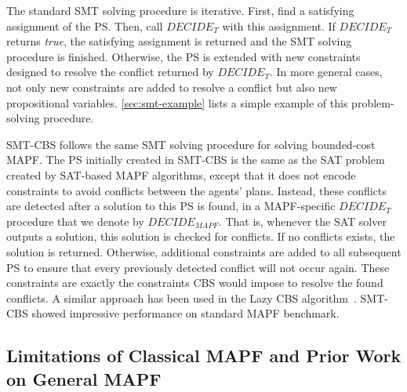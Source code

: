 \documentclass[review]{elsarticle}
\newcommand{\decidet}{\ensuremath{\mathit{DECIDE_T}}\xspace}
\newcommand{\decidemapf}{\ensuremath{\mathit{DECIDE_{MAPF}}}\xspace}
\newcommand\konstantin[1]{\nb{\textbf{Konstantin:}}{red}{#1}}
\newcommand\roni[1]{\nb{\textbf{Roni:}}{green}{#1}}
\newcommand{\smt}{\ac{SMT}\xspace}
\newcommand{\cbs}{\ac{CBS}\xspace}
\newcommand{\ps}{\ac{PS}\xspace}
\newcommand{\smtcbsO}{SMT-CBS\xspace} %
\newcommand{\mapf}{\ac{MAPF}\xspace}
\newcommand{\true}{\textit{true}\xspace}
\begin{document}
The standard \smt solving procedure is iterative. First, find a satisfying assignment of the \ps. 
Then, call \decidet with this assignment. If \decidet returns \true, the satisfying assignment is returned and the \smt solving procedure is finished. 
Otherwise, the \ps is extended with new constraints designed to resolve the conflict returned by \decidet. 
In more general cases, not only new constraints are added to resolve a conflict but also new propositional variables. \ref{sec:smt-example} lists a simple example of this problem-solving procedure. 


\smtcbsO follows the same \smt solving procedure for solving bounded-cost \mapf. The \ps initially created in \smtcbsO is the same as the SAT problem created by SAT-based \mapf algorithms, except that it does not encode constraints to avoid conflicts between the agents' plans. 
Instead, these conflicts are detected after a solution to this \ps is found, in a \mapf-specific \decidet procedure that we denote by \decidemapf. 
That is, whenever the SAT solver outputs a solution, this solution is checked for conflicts. If no conflicts exists, the solution is returned. Otherwise, additional constraints are added to all subsequent \ps to ensure that every previously detected conflict will not occur again. These constraints are exactly the constraints \cbs would impose to resolve the found conflicts. 
A similar approach has been used in the Lazy CBS algorithm~\cite{gange2019lazy}. 
\smtcbsO showed impressive performance on standard \mapf benchmark. 




\subsection{Limitations of Classical MAPF and Prior Work on General MAPF}
\label{sec:limitations}
\end{document}
